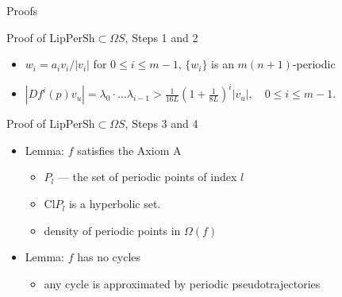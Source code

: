 \documentclass{beamer}
\begin{document}
\begin{section}{Proofs}
\begin{frame}{Proof of $\mbox{LipPerSh}\subset\Omega S$, Steps 1 and 2}
\begin{itemize}
\begin{itemize}
$$\lambda_i=|v_{i+1}|/|v_i|,\quad 	a_0=\tau,\ \  a_{i+1}=\lambda_i a_i-1,$$ %
where $\tau$ is chosen such that $a_m=0$ 
	\item $w_i=a_iv_i/|v_i|$ for $0\leq i\leq m-1$, $\{w_i\}$ is an $m(n+1)$-periodic%
	\item $|Df^i(p)v_u|=\lambda_0\cdot\ldots\lambda_{i-1}>\frac{1}{16L}\left(1+\frac{1}{8L}\right)^i|v_u|, \quad 0\leq i\leq m-1.$
\end{itemize}
\end{itemize}
\end{frame}
\begin{frame}{Proof of $\mbox{LipPerSh}\subset\Omega S$, Steps 3 and 4}
\begin{itemize}
	\item Lemma: $f$ satisfies the Axiom A
\begin{itemize}
  \item $P_l$ --- the set of periodic points of index $l$
	\item $\mbox{Cl}P_l$ is a hyperbolic set.
	\item density of periodic points in $\Omega(f)$
\end{itemize}
	\item Lemma:	$f$ has no cycles 
\begin{itemize}
\item any cycle is approximated by periodic pseudotrajectories

\end{itemize}
\end{itemize}
\end{frame}
\end{section}
\end{document}
